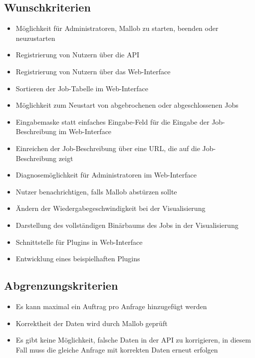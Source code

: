         
\subsection{Wunschkriterien}
    \begin{itemize}[noitemsep]
        \item Möglichkeit für Administratoren, Mallob zu starten, beenden oder neuzustarten
        \item Registrierung von Nutzern über die API
        \item Registrierung von Nutzern über das Web-Interface
        \item Sortieren der Job-Tabelle im Web-Interface
        \item Möglichkeit zum Neustart von abgebrochenen oder abgeschlossenen Jobs
        \item Eingabemaske statt einfaches Eingabe-Feld für die Eingabe der Job-Beschreibung im Web-Interface
        \item Einreichen der Job-Beschreibung über eine URL, die auf die Job-Beschreibung zeigt
        \item Diagnosemöglichkeit für Administratoren im Web-Interface
        \item Nutzer benachrichtigen, falls Mallob abstürzen sollte
        \item Ändern der Wiedergabegeschwindigkeit bei der Visualisierung
        \item Darstellung des vollständigen Binärbaums des Jobs in der Visualisierung
        \item Schnittstelle für Plugins in Web-Interface
        \item Entwicklung eines beispielhaften Plugins
    \end{itemize}
    
\subsection{Abgrenzungskriterien}
    \begin{itemize}[noitemsep]
        \item Es kann maximal ein Auftrag pro Anfrage hinzugefügt werden
        \item Korrektheit der Daten wird durch Mallob geprüft
        \item Es gibt keine Möglichkeit, falsche Daten in der API zu korrigieren, in diesem Fall muss die gleiche Anfrage mit korrekten Daten erneut erfolgen
    \end{itemize}
